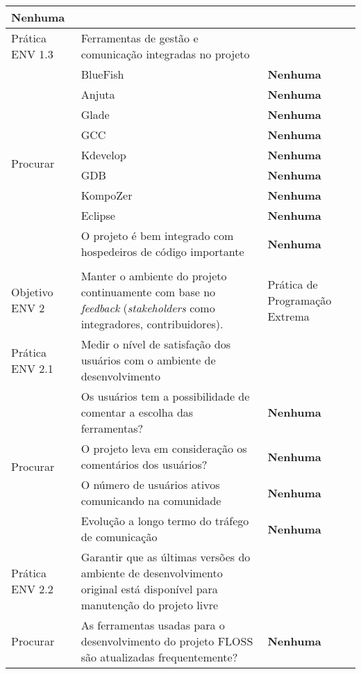 \begin{longtable}{|p{2cm}|p{7cm}|p{7cm}|}
  \textbf{Nenhuma} \\
  \hline \cellcolor[gray]{0.9} Prática ENV 1.3 & \cellcolor[gray]{0.9}
  Ferramentas de gestão e comunicação integradas no projeto & \\
  \hline \multirow{9}{*}{Procurar} & BlueFish  & \textbf{Nenhuma} \\
  \cline{2-3} & Anjuta & \textbf{Nenhuma} \\
  \cline{2-3} & Glade & \textbf{Nenhuma} \\
  \cline{2-3} & GCC & \textbf{Nenhuma} \\
  \cline{2-3} & Kdevelop & \textbf{Nenhuma} \\
  \cline{2-3} & GDB & \textbf{Nenhuma} \\
  \cline{2-3} & KompoZer & \textbf{Nenhuma} \\
  \cline{2-3} & Eclipse & \textbf{Nenhuma} \\
  \cline{2-3} & O projeto é bem integrado com hospedeiros de
  código importante & \textbf{Nenhuma} \\
  \hline
  & & \\
  \hline \cellcolor[gray]{0.6} Objetivo ENV 2 & \cellcolor[gray]{0.6}
  Manter o ambiente do projeto continuamente com base no
  \textit{feedback} (\textit{stakeholders} como integradores,
  contribuidores). & Prática de Programação Extrema \\
  \hline \cellcolor[gray]{0.9} Prática ENV 2.1 & \cellcolor[gray]{0.9}
  Medir o nível de satisfação dos usuários com o ambiente de
  desenvolvimento & \\
  \hline \multirow{4}{*}{Procurar} & Os usuários tem a possibilidade
  de comentar a escolha das ferramentas?  & \textbf{Nenhuma} \\
  \cline{2-3} & O projeto leva em consideração os comentários dos
  usuários? & \textbf{Nenhuma} \\
  \cline{2-3} & O número de usuários ativos comunicando na comunidade
  & \textbf{Nenhuma} \\
  \cline{2-3} & Evolução a longo termo do tráfego de comunicação &
  \textbf{Nenhuma} \\
  \hline \cellcolor[gray]{0.9} Prática ENV 2.2 & \cellcolor[gray]{0.9}
  Garantir que as últimas versões do ambiente de desenvolvimento
  original está disponível para manutenção do projeto livre & \\
  \hline \multirow{1}{*}{Procurar} & As ferramentas usadas para o
  desenvolvimento do projeto FLOSS são atualizadas frequentemente?  &
  \textbf{Nenhuma} \\

\end{longtable}

